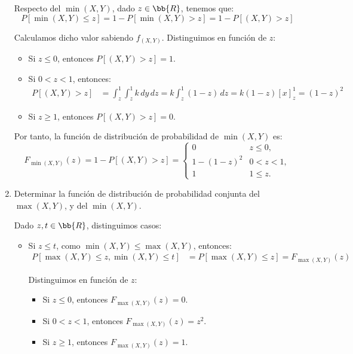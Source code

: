 \begin{ejercicio}
\begin{enumerate}
        Respecto del $\min(X,Y)$, dado $z\in \bb{R}$, tenemos que:
        \begin{equation*}
            P[\min(X,Y)\leq z]=1-P[\min(X,Y)>z]=1-P[(X,Y)>z]
        \end{equation*}

        Calculamos dicho valor sabiendo $f_{(X,Y)}$. Distinguimos en función de $z$:
        \begin{itemize}
            \item Si $z\leq 0$, entonces $P[(X,Y)>z]=1$.

            \item Si $0<z<1$, entonces:
            \begin{align*}
                P[(X,Y)>z]&=\int_{z}^{1}\int_{z}^{1} k \, dy \, dz = k\int_{z}^{1} (1-z) \, dz
                = k(1-z)\left[x\right]_{z}^{1} = (1-z)^2
            \end{align*}

            \item Si $z\geq 1$, entonces $P[(X,Y)>z]=0$.
        \end{itemize}

        Por tanto, la función de distribución de probabilidad de $\min(X,Y)$ es:
        \begin{equation*}
            F_{\min(X,Y)}(z) = 1-P[(X,Y)>z]=\begin{cases}
                0 & z\leq 0, \\
                1-(1-z)^2 & 0<z<1, \\
                1 & 1\leq z.
            \end{cases}
        \end{equation*}

        \item Determinar la función de distribución de probabilidad conjunta del $\max(X,Y)$, y del $\min(X,Y)$.
        
        Dado $z,t\in \bb{R}$, distinguimos casos:
        \begin{itemize}
            \item Si $z\leq t$, como $\min (X,Y)\leq \max(X,Y)$, entonces:
            \begin{align*}
                P[\max(X,Y)\leq z,\min(X,Y)\leq t]&=P[\max(X,Y)\leq z] = F_{\max(X,Y)}(z)
            \end{align*}

            Distinguimos en función de $z$:
            \begin{itemize}
                \item Si $z\leq 0$, entonces $F_{\max(X,Y)}(z)=0$.
                \item Si $0<z<1$, entonces $F_{\max(X,Y)}(z)=z^2$.
                \item Si $z\geq 1$, entonces $F_{\max(X,Y)}(z)=1$.
            \end{itemize}


\end{itemize}
\end{enumerate}
\end{ejercicio}

